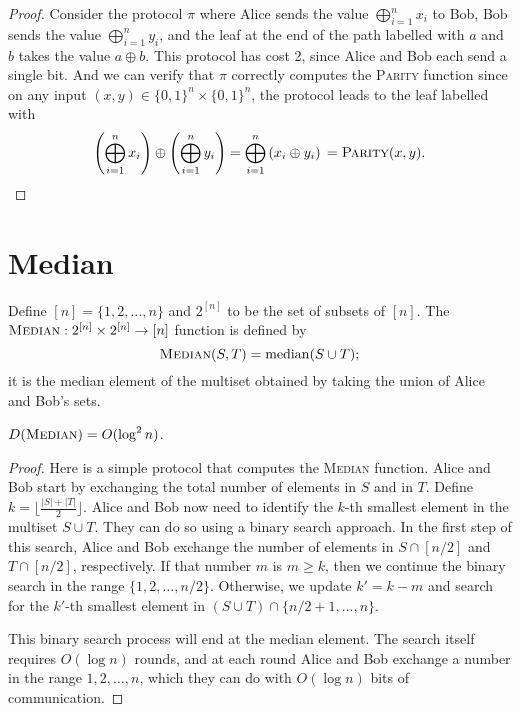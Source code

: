 \begin{proof}
	Consider the protocol $\pi$ where Alice sends the value $\bigoplus_{i=1}^n x_i$ to Bob, Bob sends the value $\bigoplus_{i=1}^n y_i$, and the leaf at the end of the path labelled with $a$ and $b$ takes the value $a \oplus b$. This protocol has cost 2, since Alice and Bob each send a single bit. And we can verify that $\pi$ correctly computes the \textsc{Parity} function since on any input $(x,y) \in \{0,1\}^n \times \{0,1\}^n$, the protocol leads to the leaf labelled with
	\[
	\left( \bigoplus_{i=1}^n x_i \right) \oplus 
	\left( \bigoplus_{i=1}^n y_i \right) 
	=  \bigoplus_{i=1}^n \left(x_i \oplus y_i \right) \\
	= \textsc{Parity}(x,y). \qedhere
	\]
\end{proof}


\section{Median}
Define $[n] = \{1,2,\ldots,n\}$ and $2^{[n]}$ to be the set of subsets of $[n]$. The $\textsc{Median} : 2^{[n]} \times 2^{[n]} \to [n]$ function is defined by
\[
\textsc{Median}(S,T) = \mathrm{median}(S \cup T);
\]
it is the median element of the multiset obtained by taking the union of Alice and Bob's sets. 

\begin{theorem}
	$D(\textsc{Median}) = O(\log^2 n)$.
\end{theorem}

\begin{proof}
	Here is a simple protocol that computes the \textsc{Median} function. Alice and Bob start by exchanging the total number of elements in $S$ and in $T$. Define $k = \lfloor \frac{|S| + |T|}2 \rfloor$. Alice and Bob now need to identify the $k$-th smallest element in the multiset $S \cup T$. They can do so using a binary search approach. In the first step of this search, Alice and Bob exchange the number of elements in $S \cap [n/2]$ and $T \cap [n/2]$, respectively. If that number $m$ is $m \ge k$, then we continue the binary search in the range $\{1,2,\ldots,n/2\}$. Otherwise, we update $k' = k - m$ and search for the $k'$-th smallest element in $(S \cup T) \cap \{n/2+1,\ldots,n\}$.
	
	This binary search process will end at the median element. The search itself requires $O( \log n)$ rounds, and at each round Alice and Bob exchange a number in the range $1,2,\ldots,n$, which they can do with $O(\log n)$ bits of communication.
\end{proof}

